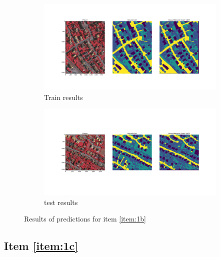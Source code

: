 \documentclass[10pt, a4paper]{article}
\begin{document}
\begin{figure}[htpb]
  \centering
  \begin{subfigure}[b]{1.0\textwidth}
      \centering
      \includegraphics[width=\textwidth]{images/Patch64_imagenet_train.pdf}
      \caption{Train results}
      \label{fig:q1b_train}
  \end{subfigure}
  \hfill
  \begin{subfigure}[b]{1.0\textwidth}
    \centering
    \includegraphics[width=\textwidth]{images/Patch64_imagenet_test.pdf}
    \caption{test results}
    \label{fig:q1b_test}
  \end{subfigure}
  \caption{Results of predictions for item \ref{item:1b}}
  \label{fig:q1b_results}
\end{figure}

\subsection{Item \ref{item:1c}}

\lipsum[1]
\end{document}
